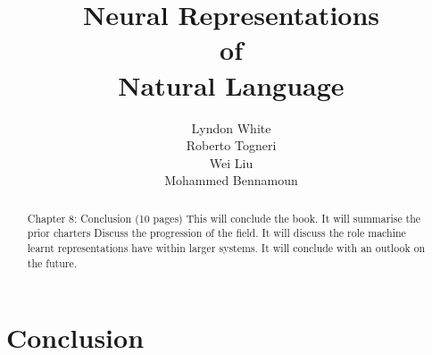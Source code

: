 \documentclass[12pt,parskip]{komatufte}
\begin{document}
\title{Neural Representations \\of\\ Natural Language}
\author{Lyndon White\\ Roberto Togneri\\ Wei Liu\\ Mohammed Bennamoun}
\publishers{SpringerBriefs in Computer Science}


\maketitle

\tableofcontents













\chapter{Conclusion}\label{sec:conclusion}
\begin{abstract}
Chapter 8: Conclusion (10 pages)
This will conclude the book. 
It will summarise the prior charters
Discuss the progression of the field.
It will discuss the role machine learnt representations have within larger systems.
It will conclude with an outlook on the future.
\end{abstract}


\clearpage
{}
\printbibliography
\end{document}
